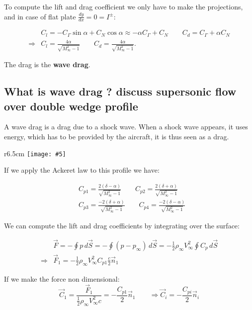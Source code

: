 \documentclass[british,french,11pt, a4paper, openany]{article}
\newcommand{\wrapfig}[6]{%
	\begin{wrapfigure}[#1]{#2}{#3cm}%
		\vspace{-5mm}%
		\texttt{[image: \#5]}%
		\captionof{figure}{}%
		\label{#6}%
	\end{wrapfigure}%
}
\begin{document}
To compute the lift and drag coefficient we only have to make the projections, and in case of flat plate $\frac{dy}{dx} = 0 = I^\pm$: 

\begin{equation}
\begin{aligned}
&C_l = -C_\Gamma \sin \alpha + C_N \cos \alpha \approx -\alpha C_\Gamma  + C_N \qquad C_d = C_\Gamma  + \alpha C_N\\
\Rightarrow &C_l = \frac{4\alpha}{\sqrt{M_\infty ^2 -1}} \qquad C_d = \frac{4\alpha}{\sqrt{M_\infty ^2 -1}}.
\end{aligned}
\end{equation}

The drag is the \textbf{wave drag}.

\subsection{What is wave drag ? discuss supersonic flow over double wedge profile}
A wave drag is a drag due to a shock wave. When a shock wave appears, it uses energy, which has to be provided by the aircraft, it is thus seen as a drag.

\wrapfig{8}{r}{6.5}{0.1}{ch6/19}{fig:6.19}
If we apply the Ackeret law to this profile we have:

\begin{equation}
\begin{aligned}
&C_{p1} = \frac{2(\delta - \alpha)}{\sqrt{M_\infty^2 -1}} \qquad C_{p2} = \frac{2(\delta + \alpha)}{\sqrt{M_\infty^2 -1}} \\
&C_{p3} = \frac{-2(\delta + \alpha)}{\sqrt{M_\infty^2 -1}} \qquad C_{p4} = \frac{-2(\delta - \alpha)}{\sqrt{M_\infty^2 -1}}
\end{aligned}
\end{equation}

We can compute the lift and drag coefficients by integrating over the surface:

\begin{equation}
\begin{aligned}
&\vec{F} = -\oint p\, d\vec{S} = -\oint (p-p_\infty)\, d\vec{S} = -\frac{1}{2} \rho _\infty V_\infty ^2 \oint C_p\, d\vec{S}\\
\Rightarrow &\vec{F}_1 = -\frac{1}{2} \rho _\infty V_\infty ^2 C_{p1} \frac{c}{2} \vec{n}_1
\end{aligned}
\end{equation}

If we make the force non dimensional: 
\begin{equation}
\vec{C}_1 = \frac{\vec{F}_1}{\frac{1}{2}\rho _\infty V_\infty ^2 c} = -\frac{C_{p1}}{2} \vec{n}_1 \qquad \Rightarrow \vec{C}_i = -\frac{C_{pi}}{2} \vec{n}_i
\end{equation}
\end{document}
